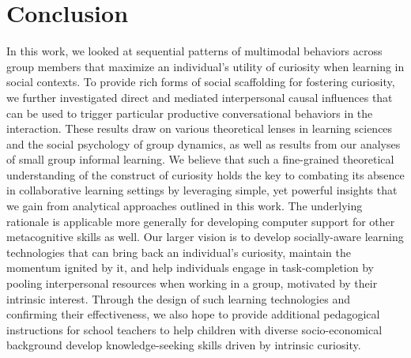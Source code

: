 \documentclass{llncs}
\begin{document}
\section{Conclusion}
\vspace{-0.35cm}
In this work, we looked at sequential patterns of multimodal behaviors across group members that maximize an individual's utility of curiosity when learning in social contexts. To provide rich forms of social scaffolding for fostering curiosity, we further investigated direct and mediated interpersonal causal influences that can be used to trigger particular productive conversational behaviors in the interaction. These results draw on various theoretical lenses in learning sciences and the social psychology of group dynamics, as well as results from our analyses of small group informal learning. We believe that such a fine-grained theoretical understanding of the construct of curiosity holds the key to combating its absence in collaborative learning settings by leveraging simple, yet powerful insights that we gain from analytical approaches outlined in this work. The underlying rationale is applicable more generally for developing computer support for other metacognitive skills as well. Our larger vision is to develop socially-aware learning technologies \cite{zhao2016socially} that can bring back an individual's curiosity, maintain the momentum ignited by it, and help individuals engage in task-completion by pooling interpersonal resources when working in a group, motivated by their intrinsic interest. Through the design of such learning technologies and confirming their effectiveness, we also hope to provide additional pedagogical instructions for school teachers to help children with diverse socio-economical background develop knowledge-seeking skills driven by intrinsic curiosity.
\vspace{-0.4cm}


 
\end{document}
